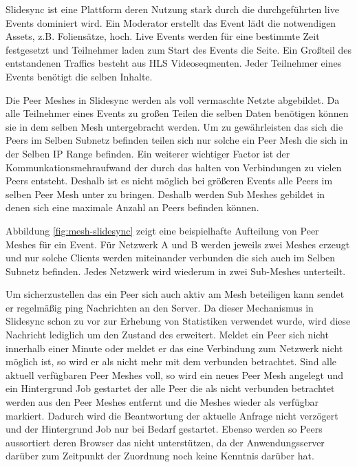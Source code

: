 Slidesync ist eine Plattform deren Nutzung stark durch die durchgeführten live Events dominiert wird. Ein Moderator erstellt das Event lädt die notwendigen Assets, z.B. Foliensätze, hoch. Live Events werden für eine bestimmte Zeit festgesetzt und Teilnehmer laden zum Start des Events die Seite. Ein Großteil des entstandenen Traffics besteht aus HLS Videoseqmenten. Jeder Teilnehmer eines Events benötigt die selben Inhalte. 

Die Peer Meshes in Slidesync werden als voll vermaschte Netzte abgebildet. Da alle Teilnehmer eines Events zu großen Teilen die selben Daten benötigen können sie in dem selben Mesh untergebracht werden. Um zu gewährleisten das sich die Peers im Selben Subnetz befinden teilen sich nur solche ein Peer Mesh die sich in der Selben IP Range befinden. Ein weiterer wichtiger Factor ist der Kommunkationsmehraufwand der durch das halten von Verbindungen zu vielen Peers entsteht. Deshalb ist es nicht möglich bei größeren Events alle Peers im selben Peer Mesh unter zu bringen. Deshalb werden Sub Meshes gebildet in denen sich eine maximale Anzahl an Peers befinden können. 

Abbildung \ref{fig:mesh-slidesync} zeigt eine beispielhafte Aufteilung von Peer Meshes für ein Event. Für Netzwerk A und B werden jeweils zwei Meshes erzeugt und nur solche Clients werden miteinander verbunden die sich auch im Selben Subnetz befinden. Jedes Netzwerk wird wiederum in zwei Sub-Meshes unterteilt.

Um sicherzustellen das ein Peer sich auch aktiv am Mesh beteiligen kann sendet er regelmäßig ping Nachrichten an den Server. Da dieser Mechanismus in Slidesync schon zu vor zur Erhebung von Statistiken verwendet wurde, wird diese Nachricht lediglich um den Zustand des \cdns erweitert. Meldet ein Peer sich nicht innerhalb einer Minute oder meldet er das eine Verbindung zum \pTp Netzwerk nicht möglich ist, so wird er als nicht mehr mit dem \pTp \cdn verbunden betrachtet. Sind alle aktuell verfügbaren Peer Meshes voll, so wird ein neues Peer Mesh angelegt und ein Hintergrund Job gestartet der alle Peer die als nicht verbunden betrachtet werden aus den Peer Meshes entfernt und die Meshes wieder als verfügbar markiert. Dadurch wird die Beantwortung der aktuelle Anfrage nicht verzögert und der Hintergrund Job nur bei Bedarf gestartet. Ebenso werden so Peers aussortiert deren Browser das \pTp \cdn nicht unterstützen, da der Anwendungsserver darüber zum Zeitpunkt der Zuordnung noch keine Kenntnis darüber hat.

